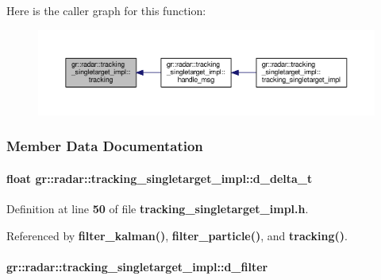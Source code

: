 Here is the caller graph for this function\+:
\nopagebreak
\begin{figure}[H]
\begin{center}
\leavevmode
\includegraphics[width=350pt]{d2/d96/classgr_1_1radar_1_1tracking__singletarget__impl_a235e285feca92fcd9488f8e4047d00a2_icgraph}
\end{center}
\end{figure}




\subsubsection{Member Data Documentation}
\paragraph[{d\+\_\+delta\+\_\+t}]{\setlength{\rightskip}{0pt plus 5cm}float gr\+::radar\+::tracking\+\_\+singletarget\+\_\+impl\+::d\+\_\+delta\+\_\+t}\label{classgr_1_1radar_1_1tracking__singletarget__impl_ab020688b162319ad46bc1eb389605bd0}


Definition at line {\bf 50} of file {\bf tracking\+\_\+singletarget\+\_\+impl.\+h}.



Referenced by {\bf filter\+\_\+kalman()}, {\bf filter\+\_\+particle()}, and {\bf tracking()}.

\paragraph[{d\+\_\+filter}]{ gr\+::radar\+::tracking\+\_\+singletarget\+\_\+impl\+::d\+\_\+filter}\label{classgr_1_1radar_1_1tracking__singletarget__impl_acc7a8404592afd7c9d2d5133496a1fae}


